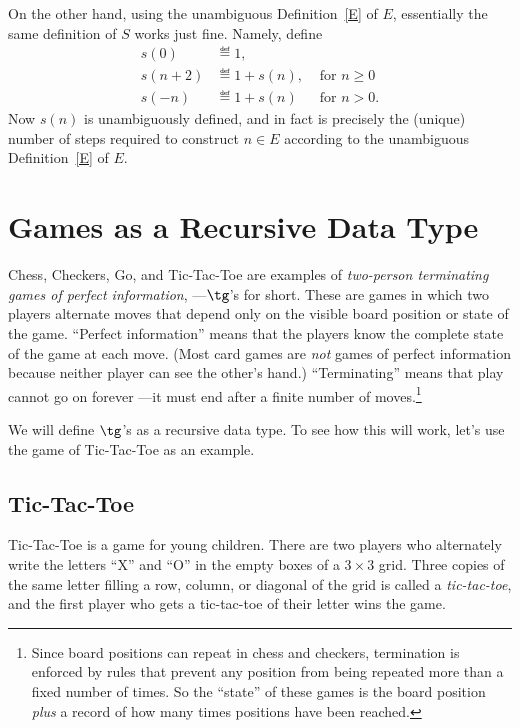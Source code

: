 \begin{definition}
\begin{staffnotes}
On the other hand, using the unambiguous Definition~\ref{E} of $E$,
essentially the same definition of $S$ works just fine.  Namely, define
\begin{align*}
  s(0) & \eqdef 1,\\
  s(n+2) & \eqdef 1+ s(n), & \text{ for } n \geq 0\\
  s(-n) & \eqdef 1+ s(n) & \text{ for } n > 0.
\end{align*}
Now $s(n)$ is unambiguously defined, and in fact is precisely the (unique)
number of steps required to construct $n \in E$ according to the
unambiguous Definition~\ref{E} of $E$.

\end{staffnotes}


\iffalse

\section{Games as a Recursive Data Type}

Chess, Checkers, Go, and Tic-Tac-Toe are examples of \emph{two-person
  terminating games of perfect information}, ---$\tg$'s for short.  These
are games in which two players alternate moves that depend only on the
visible board position or state of the game.  ``Perfect information''
means that the players know the complete state of the game at each move.
(Most card games are \emph{not} games of perfect information because
neither player can see the other's hand.)  ``Terminating'' means that play
cannot go on forever ---it must end after a finite number of
moves.\footnote{Since board positions can repeat in chess and checkers,
  termination is enforced by rules that prevent any position from being
  repeated more than a fixed number of times.  So the ``state'' of these
  games is the board position \emph{plus} a record of how many times
  positions have been reached.}

We will define $\tg$'s \iffalse in a straightforward way tagged\fi as a 
recursive data type.  To see how this will work, let's use the game of
Tic-Tac-Toe as an example.

\subsection{Tic-Tac-Toe}

Tic-Tac-Toe is a game for young children.  There are two players who
alternately write the letters ``X'' and ``O'' in the empty boxes of a $3
\times 3$ grid.  Three copies of the same letter filling a row, column, or
diagonal of the grid is called a \emph{tic-tac-toe}, and the first player
who gets a tic-tac-toe of their letter wins the game.


\end{definition}
